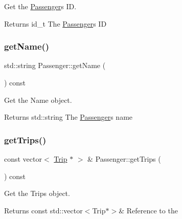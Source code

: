 Get the \mbox{\hyperlink{classPassenger}{Passenger}}\textquotesingle{}s ID. 

\begin{DoxyReturn}{Returns}
id\+\_\+t The \mbox{\hyperlink{classPassenger}{Passenger}}\textquotesingle{}s ID 
\end{DoxyReturn}
\mbox{\label{classPassenger_a7c919f6947817ff1c6a4ee51923c116f}} 
\subsubsection{\texorpdfstring{get\+Name()}{getName()}}
{\footnotesize\ttfamily std\+::string Passenger\+::get\+Name (\begin{DoxyParamCaption}{ }\end{DoxyParamCaption}) const}



Get the Name object. 

\begin{DoxyReturn}{Returns}
std\+::string The \mbox{\hyperlink{classPassenger}{Passenger}}\textquotesingle{}s name 
\end{DoxyReturn}
\mbox{\label{classPassenger_a06dfa54524d4ca1a85b1599b278fb871}} 
\subsubsection{\texorpdfstring{get\+Trips()}{getTrips()}}
{\footnotesize\ttfamily const vector$<$ \mbox{\hyperlink{classTrip}{Trip}} $\ast$ $>$ \& Passenger\+::get\+Trips (\begin{DoxyParamCaption}{ }\end{DoxyParamCaption}) const}



Get the Trips object. 

\begin{DoxyReturn}{Returns}
const std\+::vector$<$\+Trip$\ast$$>$\& Reference to the 
\end{DoxyReturn}
\mbox{\label{classPassenger_a72e4042544557a3dd9c02198aa2582d8}} 
